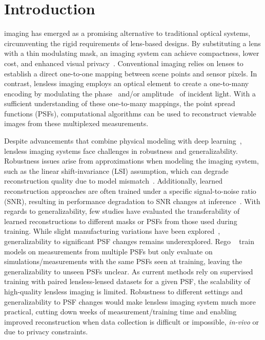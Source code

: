 \section{Introduction}
\label{sec:introduction}


 imaging has emerged as a promising alternative to traditional optical systems, circumventing the rigid requirements of lens-based designs.
By substituting a lens with a thin modulating mask, an imaging system can achieve compactness, lower cost, and enhanced visual privacy~\cite{boominathan2022recent}.
Conventional imaging relies on lenses to establish a direct one-to-one mapping between scene points and sensor pixels. 
In contrast, lensless imaging employs an optical element to create a one-to-many encoding by modulating the phase~\cite{Antipa:18,Monakhova:19,phlatcam,9239993,Lee:23} and/or amplitude~\cite{flatcam,wu2020single} of incident light.
With a sufficient understanding of these one-to-many mappings, \ie the point spread functions (PSFs), 
computational algorithms can be used to reconstruct viewable images from these multiplexed measurements.

Despite advancements that combine physical modeling with deep learning~\cite{Monakhova:19,9239993},
lensless imaging systems face challenges in robustness and generalizability. 
Robustness issues arise from approximations when modeling the imaging system, such as the linear shift-invariance (LSI) assumption, which can degrade reconstruction quality due to model mismatch~\cite{9546648}.
Additionally, learned reconstruction approaches are often trained under a specific signal-to-noise ratio (SNR), 
resulting in performance degradation to SNR changes at inference~\cite{Rego2021,Perron2023}.
With regards to generalizability, few studies have evaluated the transferability of learned reconstructions to different masks or PSFs from those used during training. 
While slight manufacturing variations have been explored~\cite{Lee:23},
generalizability to significant PSF changes remains underexplored. 
Rego \etal~\cite{Rego2021} train models on measurements from multiple PSFs but only evaluate on simulations/measurements with the same PSFs seen at training,
leaving the generalizability to unseen PSFs unclear.
As current methods rely on supervised training with paired lensless-lensed datasets for a given PSF,
the scalability of high-quality lensless imaging is limited.
Robustness to different settings and generalizability to PSF changes would make lensless imaging system much more practical, \ie cutting down weeks of measurement/training time and enabling improved reconstruction when data collection is difficult or impossible, \eg \textit{in-vivo} or due to privacy constraints.

